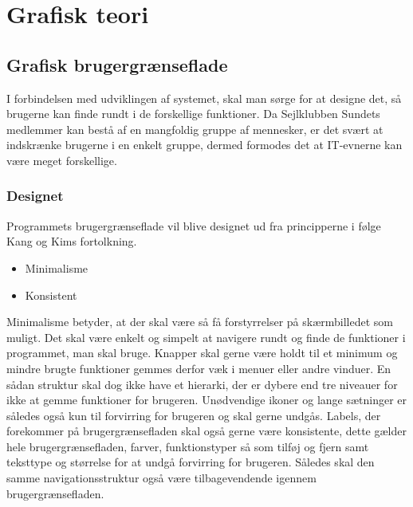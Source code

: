 \chapter{Grafisk teori}



\section{Grafisk brugergrænseflade} \label{chap:GUI}

I forbindelsen med udviklingen af systemet, skal man sørge for at designe det, så brugerne kan finde rundt i de forskellige funktioner. 
Da Sejlklubben Sundets medlemmer kan bestå af en mangfoldig gruppe af mennesker, er det svært at indskrænke brugerne i en enkelt gruppe, dermed formodes det at IT-evnerne kan være meget forskellige.


\subsection{Designet} \label{sec:Designet}

Programmets brugergrænseflade vil blive designet ud fra principperne i følge Kang og Kims fortolkning. \citep{gui1} 

\begin{itemize}
	\item Minimalisme
	\item Konsistent
\end{itemize}

Minimalisme betyder, at der skal være så få forstyrrelser på skærmbilledet som muligt. 
Det skal være enkelt og simpelt at navigere rundt og finde de funktioner i programmet, man skal bruge. Knapper skal gerne være holdt til et minimum og mindre brugte funktioner gemmes derfor væk i menuer eller andre vinduer.
En sådan struktur skal dog ikke have et hierarki, der er dybere end tre niveauer for ikke at gemme funktioner for brugeren.
Unødvendige ikoner og lange sætninger er således også kun til forvirring for brugeren og skal gerne undgås.
Labels, der forekommer på brugergrænsefladen skal også gerne være konsistente, dette gælder hele brugergrænsefladen, farver, funktionstyper så som tilføj og fjern samt teksttype og størrelse for at undgå forvirring for brugeren.
Således skal den samme navigationsstruktur også være tilbagevendende igennem brugergrænsefladen.

